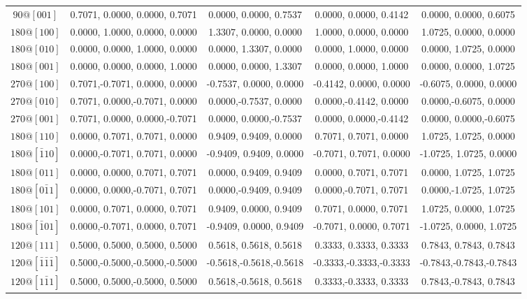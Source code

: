 \begin{table}[h!]
\begin{warpprint}
{\begin{tabular}{ccccc}
$90@[001]$ &  0.7071, 0.0000, 0.0000, 0.7071 &  0.0000, 0.0000, 0.7537 &  0.0000, 0.0000, 0.4142 &  0.0000, 0.0000, 0.6075 \\
$180@[100]$ &  0.0000, 1.0000, 0.0000, 0.0000 &  1.3307, 0.0000, 0.0000 &  1.0000, 0.0000, 0.0000 &  1.0725, 0.0000, 0.0000 \\
$180@[010]$ &  0.0000, 0.0000, 1.0000, 0.0000 &  0.0000, 1.3307, 0.0000 &  0.0000, 1.0000, 0.0000 &  0.0000, 1.0725, 0.0000 \\ 
$180@[001]$ &  0.0000, 0.0000, 0.0000, 1.0000 &  0.0000, 0.0000, 1.3307 &  0.0000, 0.0000, 1.0000 &  0.0000, 0.0000, 1.0725 \\ 
$270@[100]$ &  0.7071,-0.7071, 0.0000, 0.0000 & -0.7537, 0.0000, 0.0000 & -0.4142, 0.0000, 0.0000 & -0.6075, 0.0000, 0.0000 \\
$270@[010]$ &  0.7071, 0.0000,-0.7071, 0.0000 &  0.0000,-0.7537, 0.0000 &  0.0000,-0.4142, 0.0000 &  0.0000,-0.6075, 0.0000 \\
$270@[001]$ &  0.7071, 0.0000, 0.0000,-0.7071 &  0.0000, 0.0000,-0.7537 &  0.0000, 0.0000,-0.4142 &  0.0000, 0.0000,-0.6075 \\
\hline
$180@[110]$ &  0.0000, 0.7071, 0.7071, 0.0000 &  0.9409, 0.9409, 0.0000 &  0.7071, 0.7071, 0.0000 &  1.0725, 1.0725, 0.0000 \\ 
$180@[\bar{1}10]$ &  0.0000,-0.7071, 0.7071, 0.0000 & -0.9409, 0.9409, 0.0000 & -0.7071, 0.7071, 0.0000 & -1.0725, 1.0725, 0.0000 \\
$180@[011]$ &  0.0000, 0.0000, 0.7071, 0.7071 &  0.0000, 0.9409, 0.9409 &  0.0000, 0.7071, 0.7071 &  0.0000, 1.0725, 1.0725 \\
$180@[0\bar{1}1]$ &  0.0000, 0.0000,-0.7071, 0.7071 &  0.0000,-0.9409, 0.9409 &  0.0000,-0.7071, 0.7071 &  0.0000,-1.0725, 1.0725 \\
$180@[101]$ &  0.0000, 0.7071, 0.0000, 0.7071 &  0.9409, 0.0000, 0.9409 &  0.7071, 0.0000, 0.7071 &  1.0725, 0.0000, 1.0725 \\
$180@[\bar{1}01]$ &  0.0000,-0.7071, 0.0000, 0.7071 & -0.9409, 0.0000, 0.9409 & -0.7071, 0.0000, 0.7071 & -1.0725, 0.0000, 1.0725 \\
\hline
$120@[111]$ &  0.5000, 0.5000, 0.5000, 0.5000 &  0.5618, 0.5618, 0.5618 &  0.3333, 0.3333, 0.3333 &  0.7843, 0.7843, 0.7843 \\ 
$120@[\bar{1}\bar{1}\bar{1}]$ &  0.5000,-0.5000,-0.5000,-0.5000 & -0.5618,-0.5618,-0.5618 & -0.3333,-0.3333,-0.3333 & -0.7843,-0.7843,-0.7843 \\ 
$120@[1\bar{1}1]$ &  0.5000, 0.5000,-0.5000, 0.5000 &  0.5618,-0.5618, 0.5618 &  0.3333,-0.3333, 0.3333 &  0.7843,-0.7843, 0.7843 \\ 

\end{tabular}}
\end{warpprint}
\end{table}
